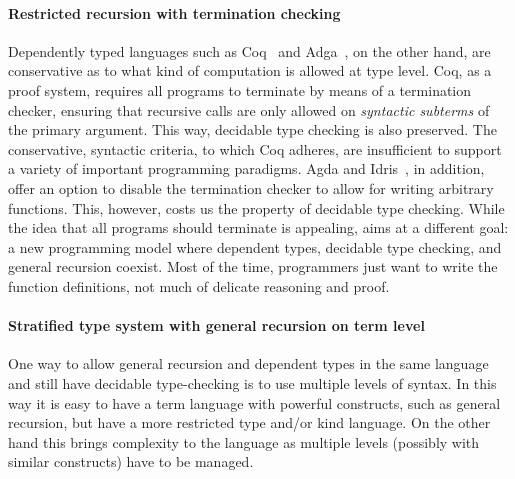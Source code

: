 \paragraph{Restricted recursion with termination checking}

Dependently typed languages such as Coq~\cite{coqsite} and
Adga~\cite{agda}, on the other hand, are conservative as to what kind
of computation is allowed at type level. Coq, as a proof system,
requires all programs to terminate by means of a termination checker,
ensuring that recursive calls are only allowed on \emph{syntactic
  subterms} of the primary argument. This way, decidable type checking
is also preserved. The conservative, syntactic criteria, to which Coq
adheres, are insufficient to support a variety of important
programming paradigms. Agda and Idris~\cite{idris}, in addition, offer
an option to disable the termination checker to allow for writing
arbitrary functions. This, however, costs us the property of decidable
type checking. While the idea that all programs should terminate is
appealing, \name aims at a different goal: a new programming model
where dependent types, decidable type checking, and general recursion
coexist. Most of the time, programmers just want to write the function
definitions, not much of delicate reasoning and proof.

\paragraph{Stratified type system with general recursion on term level}

One way to allow general recursion and dependent types in the same
language and still have decidable type-checking is to use multiple
levels of syntax. In this way it is easy to have a term language with
powerful constructs, such as general recursion, but have a more
restricted type and/or kind language. On the other hand this brings
complexity to the language as multiple levels (possibly with similar
constructs) have to be managed.

